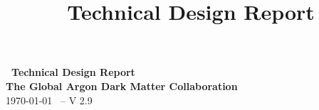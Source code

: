 \documentclass[aps,superscriptaddress,floatfix,nofootinbib,showpacs,amsmath,amssymb,altaffilletter,floatfix,11pt]{revtex4-1}
\begin{document}
\setlength{\parindent}{1em}
\setdefaultleftmargin{1em}{1em}{}{}{}{}
\setcounter{page}{0}\thispagestyle{empty}
\onecolumngrid
\begin{center}
{\bf \LARGE \DSk\ Technical Design Report}\\
\vspace{.5in}
{\bf \Large The Global Argon Dark Matter Collaboration}\\
\vspace{.5in}
\today
{\large\ -- V 2.9}
\end{center}
\vspace{.2in}

\clearpage
\newpage
{}
\title{\DSk\ Technical Design Report}

\maketitle
\clearpage
\onecolumngrid
\setcounter{tocdepth}{2}
\tableofcontents
\makeatletter
\let\toc@pre\relax
\let\toc@post\relax
\makeatother
\clearpage
\listoffigures
\clearpage
\listoftables
\clearpage
\newpage
{}
\clearpage
\onecolumngrid
\newpage
{}
\clearpage


%
  

  
  
  



 



%







\end{document}
